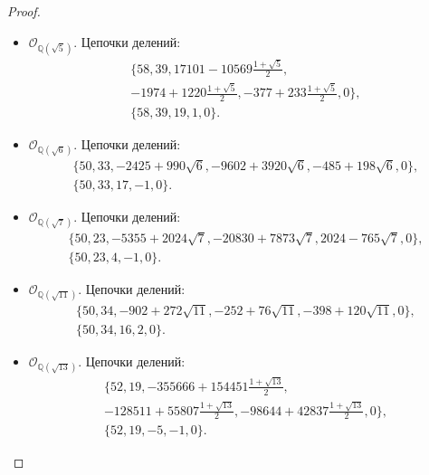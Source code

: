 \documentclass[_00_dissertation.tex]{subfiles}
\begin{document}
\begin{proof}
\begin{itemize}
        \item $\mathcal{O}_{\mathbb{Q}(\sqrt{5})}$.
        Цепочки делений:
        \begin{equation*}
            \begin{split}
                \{58, 39, 17101-10569\frac{1+\sqrt{5}}{2},\\
                    -1974+1220\frac{1+\sqrt{5}}{2}, -377+233\frac{1+\sqrt{5}}{2}, 0\},\\
                \{58, 39, 19, 1, 0\}.
            \end{split}
        \end{equation*}
    
        \item $\mathcal{O}_{\mathbb{Q}(\sqrt{6})}$.
        Цепочки делений:
        \begin{equation*}
            \begin{split}
                \{50, 33, -2425+990\sqrt{6}, -9602+3920\sqrt{6}, -485+198\sqrt{6}, 0\},\\
                \{50, 33, 17, -1, 0\}.
            \end{split}
        \end{equation*}
    
        \item $\mathcal{O}_{\mathbb{Q}(\sqrt{7})}$.
        Цепочки делений:
        \begin{equation*}
            \begin{split}
                \{50, 23, -5355+2024\sqrt{7}, -20830+7873\sqrt{7}, 2024-765\sqrt{7}, 0\},\\
                \{50, 23, 4, -1, 0\}.
            \end{split}
        \end{equation*}
    
        \item $\mathcal{O}_{\mathbb{Q}(\sqrt{11})}$.
        Цепочки делений:
        \begin{equation*}
            \begin{split}
                \{50, 34, -902+272\sqrt{11}, -252+76\sqrt{11}, -398+120\sqrt{11}, 0\},\\
                \{50, 34, 16, 2, 0\}.
            \end{split}
        \end{equation*}
    
        \item $\mathcal{O}_{\mathbb{Q}(\sqrt{13})}$.
        Цепочки делений:
        \begin{equation*}
            \begin{split}
                \{52, 19, -355666+154451\frac{1+\sqrt{13}}{2},\\
                    -128511+55807\frac{1+\sqrt{13}}{2}, -98644+42837\frac{1+\sqrt{13}}{2}, 0\},\\
                \{52, 19, -5, -1, 0\}.
            \end{split}
        \end{equation*}
    

\end{itemize}
\end{proof}
\end{document}
